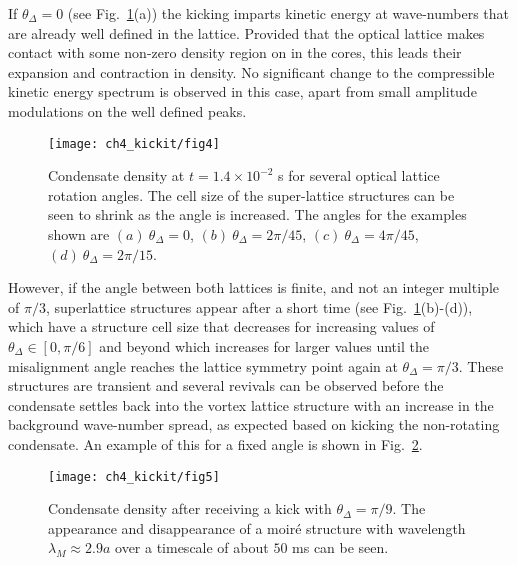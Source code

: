     If $\theta_\Delta=0$ (see Fig.~\ref{fig:moire_density}(a)) the kicking imparts kinetic energy at wave-numbers that are already well defined in the lattice. Provided that the optical lattice makes contact with some non-zero density region on in the cores, this leads their expansion and contraction in density. No significant change to the compressible kinetic energy spectrum is observed in this case, apart from small amplitude modulations on the well defined peaks.

	\begin{figure}[tb]
			\texttt{[image: ch4\_kickit/fig4]}
			\caption{Condensate density at $t=1.4\times10^{-2}$ s for several optical lattice rotation angles. The cell size of the super-lattice structures can be seen to shrink as the angle is increased. The angles for the examples shown are $(a)~\theta_\Delta=0$, $(b)~\theta_\Delta=2\pi/45$, $(c)~\theta_\Delta=4\pi/45$, $(d)~\theta_\Delta=2\pi/15$. }
			\label{fig:moire_density}
		\end{figure}

    However, if the angle between both lattices is finite, and not an integer multiple of $\pi/3$, superlattice structures appear after a short time (see Fig.~\ref{fig:moire_density}(b)-(d)), which have a structure cell size that decreases for increasing values of $\theta_\Delta\in[0,\pi/6]$ and beyond which increases for larger values until the misalignment angle reaches the lattice symmetry point again at $\theta_\Delta=\pi/3$. These structures are transient and several revivals can be observed before the condensate settles back into the vortex lattice structure with an increase in the background wave-number spread, as expected based on kicking the non-rotating condensate. An example of this for a fixed angle is shown in Fig.~\ref{fig:dtheta20_ev}.

	\begin{figure}[bt]
		\texttt{[image: ch4\_kickit/fig5]}
		\caption{Condensate density after receiving a kick with $\theta_\Delta=\pi/9$. The appearance and disappearance of a moir\'e structure with wavelength $\lambda_M \approx 2.9 a$ over a timescale of about $50$ ms can be seen.}
		\label{fig:dtheta20_ev}
	\end{figure}

